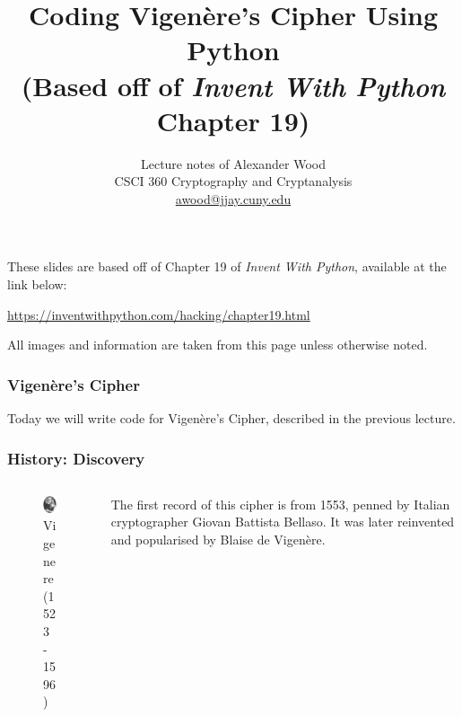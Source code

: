 \documentclass{beamer}
\title[CSCI360]{Coding Vigen\`{e}re's Cipher Using Python \\ (Based off of \emph{Invent With Python} Chapter 19)}
\author
{Lecture notes of Alexander Wood \\ CSCI 360 Cryptography and Cryptanalysis \\ \scriptsize \href{mailto:awood@jjay.cuny.edu}{awood@jjay.cuny.edu}}
\institute[JJay]{John Jay College of Criminal Justice}
\date{}
\newcommand{\<}{\langle}
\renewcommand{\>}{\rangle}
\begin{document}

\begin{frame}
  \titlepage
\end{frame}

\begin{frame}
These slides are based off of Chapter 19 of \emph{Invent With Python}, available at the link below:
\begin{center}
\url{https://inventwithpython.com/hacking/chapter19.html}
\end{center}
All images and information are taken from this page unless otherwise noted.
\end{frame}


\begin{frame}
\frametitle{Vigen\`{e}re's Cipher}

Today we will write code for Vigen\`{e}re's Cipher, described in the previous lecture.
\end{frame}


\begin{frame}
\frametitle{History: Discovery}
\begin{columns}
\begin{column}{0.5\textwidth}
\begin{figure}
\includegraphics[scale=1]{IMG/vigenere.jpg}
\caption{Vigenere (1523 - 1596)}
\end{figure}
\end{column}

\begin{column}{0.5\textwidth}
The first record of this cipher is from 1553, penned by Italian cryptographer Giovan Battista Bellaso. It was later reinvented and popularised by Blaise de Vigen\`{e}re.
\end{column}
\end{columns}
\end{frame}
\end{document}
